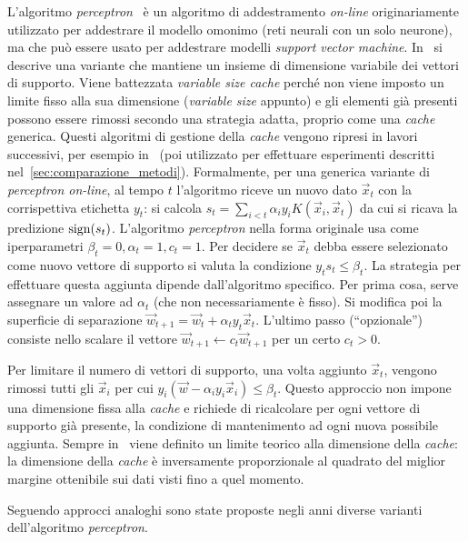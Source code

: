L'algoritmo \emph{perceptron}~\cite{1958_perceptron} è un algoritmo di addestramento \emph{on-line} originariamente utilizzato per addestrare il modello omonimo (reti neurali con un solo neurone), ma che può essere usato per addestrare modelli \emph{support vector machine}.
In~\cite{2003_online_classification_on_a_budget} si descrive una variante che mantiene un insieme di dimensione variabile dei vettori di supporto. 
Viene battezzata \emph{variable size cache} perché non viene imposto un limite fisso alla sua dimensione (\emph{variable size} appunto) e gli elementi già presenti possono essere rimossi secondo una strategia adatta, proprio come una \emph{cache} generica. 
Questi algoritmi di gestione della \emph{cache} vengono ripresi in lavori successivi, per esempio in~\cite{2012_bsgd} (poi utilizzato per effettuare esperimenti descritti nel~\cref{sec:comparazione_metodi}).
Formalmente, per una generica variante di \emph{perceptron on-line}, al tempo $t$ l'algoritmo riceve un nuovo dato $\Vec{x}_t$ con la corrispettiva etichetta $y_t$: si calcola $s_t = \sum_{i<t} \alpha_iy_iK(\Vec{x}_i, \Vec{x}_t)$ da cui si ricava la predizione $\mathrm{sign}(s_t)$. 
L'algoritmo \emph{perceptron} nella forma originale usa come iperparametri $\beta_t=0, \alpha_t=1, c_t=1$. 
Per decidere se $\Vec{x}_t$ debba essere selezionato come nuovo vettore di supporto si valuta la condizione $y_ts_t \leq \beta_t$.
La strategia per effettuare questa aggiunta dipende dall'algoritmo specifico. 
Per prima cosa, serve assegnare un valore ad $\alpha_t$ (che non necessariamente è fisso). 
Si modifica poi la superficie di separazione $\Vec{w}_{t+1} = \Vec{w}_t + \alpha_ty_t\Vec{x}_t$. 
L'ultimo passo (``opzionale'') consiste nello scalare il vettore $\Vec{w}_{t+1} \leftarrow c_t\Vec{w}_{t+1}$ per un certo $c_t > 0$. 

Per limitare il numero di vettori di supporto, una volta aggiunto $\Vec{x}_t$, vengono rimossi tutti gli $\Vec{x}_i$ per cui $y_i(\Vec{w} - \alpha_iy_i\Vec{x}_i)\leq \beta_t$. 
Questo approccio non impone una dimensione fissa alla \emph{cache} e richiede di ricalcolare per ogni vettore di supporto già presente, la condizione di mantenimento ad ogni nuova possibile aggiunta. 
Sempre in~\cite{2003_online_classification_on_a_budget} viene definito un limite teorico alla dimensione della \emph{cache}: la dimensione della \emph{cache} è inversamente proporzionale al quadrato del miglior margine ottenibile sui dati visti fino a quel momento.

Seguendo approcci analoghi sono state proposte negli anni diverse varianti dell'algoritmo \emph{perceptron}.

